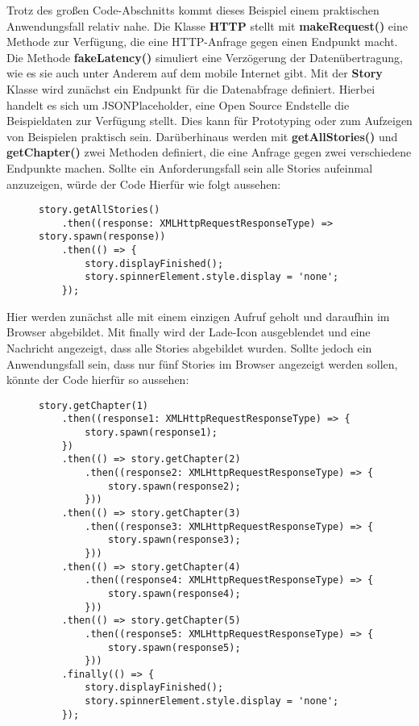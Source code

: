 Trotz des großen Code-Abschnitts kommt dieses Beispiel einem praktischen Anwendungsfall relativ nahe. Die Klasse \textbf{HTTP} stellt mit  \textbf{makeRequest()} eine Methode zur Verfügung, die eine HTTP-Anfrage gegen einen Endpunkt macht. Die Methode \textbf{fakeLatency()} simuliert eine Verzögerung der Datenübertragung, wie es sie auch unter Anderem auf dem mobile Internet gibt. Mit der \textbf{Story} Klasse wird zunächst ein Endpunkt für die Datenabfrage definiert. Hierbei handelt es sich um JSONPlaceholder, eine Open Source Endstelle die Beispieldaten zur Verfügung stellt. Dies kann für Prototyping oder zum Aufzeigen von Beispielen praktisch sein. Darüberhinaus werden mit \textbf{getAllStories()} und \textbf{getChapter()} zwei Methoden definiert, die eine Anfrage gegen zwei verschiedene Endpunkte machen.  Sollte ein Anforderungsfall sein alle Stories aufeinmal anzuzeigen, würde der Code Hierfür wie folgt aussehen:
\begin{figure}[H]
\begin{lstlisting}
story.getAllStories()
    .then((response: XMLHttpRequestResponseType) => story.spawn(response))
    .then(() => {
        story.displayFinished();
        story.spinnerElement.style.display = 'none';
    });
\end{lstlisting}
\end{figure}

\noindent
Hier werden zunächst alle mit einem einzigen Aufruf geholt und daraufhin im Browser abgebildet. Mit finally wird der Lade-Icon ausgeblendet und eine Nachricht angezeigt, dass alle Stories abgebildet wurden. Sollte jedoch ein Anwendungsfall sein, dass nur fünf Stories im Browser angezeigt werden sollen, könnte der Code hierfür so aussehen: 

\begin{figure}[H]
\begin{lstlisting}
story.getChapter(1)
    .then((response1: XMLHttpRequestResponseType) => {
        story.spawn(response1);
    })
    .then(() => story.getChapter(2)
        .then((response2: XMLHttpRequestResponseType) => {
            story.spawn(response2);
        }))
    .then(() => story.getChapter(3)
        .then((response3: XMLHttpRequestResponseType) => {
            story.spawn(response3);
        }))
    .then(() => story.getChapter(4)
        .then((response4: XMLHttpRequestResponseType) => {
            story.spawn(response4);
        }))
    .then(() => story.getChapter(5)
        .then((response5: XMLHttpRequestResponseType) => {
            story.spawn(response5);
        }))
    .finally(() => {
        story.displayFinished();
        story.spinnerElement.style.display = 'none';
    });
\end{lstlisting}
\end{figure}

